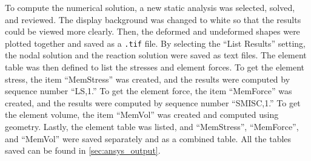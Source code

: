 To compute the numerical solution, a new static analysis was selected, solved, and reviewed. The display background was changed to white so that the results could be viewed more clearly. Then, the deformed and undeformed shapes were plotted together and saved as a \verb|.tif| file. By selecting the ``List Results'' setting, the nodal solution and the reaction solution were saved as text files. The element table was then defined to list the stresses and element forces. To get the element stress, the item ``MemStress'' was created, and the results were computed by sequence number ``LS,1.'' To get the element force, the item ``MemForce'' was created, and the results were computed by sequence number ``SMISC,1.'' To get the element volume, the item ``MemVol'' was created and computed using geometry. Lastly, the element table was listed, and ``MemStress'', ``MemForce'', and ``MemVol'' were saved separately and as a combined table. All the tables saved can be found in \autoref{sec:ansys_output}.